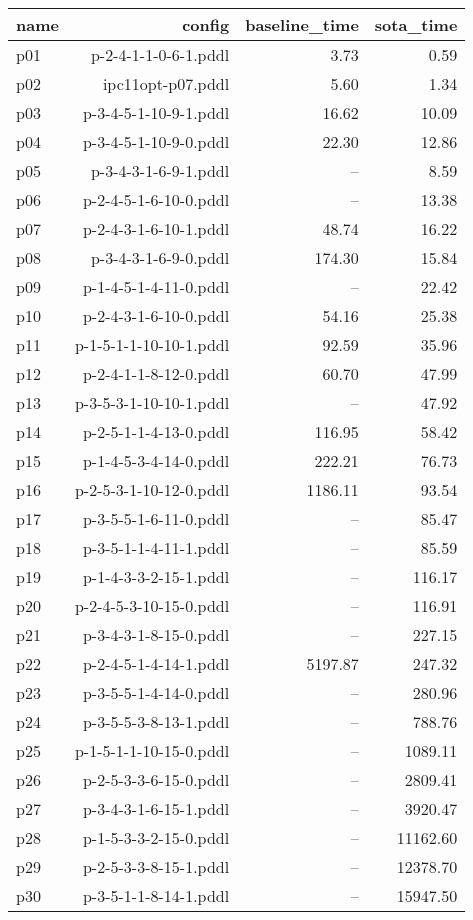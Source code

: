 \documentclass{article}
\begin{document}
                            \begin{center}
                            \scriptsize
                            \begin{tabular}{@{}l|r|r|r@{}}
                            name & config & baseline\_time & sota\_time\\\midrule
                              p01& p-2-4-1-1-0-6-1.pddl&3.73&0.59\\
  p02& ipc11opt-p07.pddl&5.60&1.34\\
  p03& p-3-4-5-1-10-9-1.pddl&16.62&10.09\\
  p04& p-3-4-5-1-10-9-0.pddl&22.30&12.86\\
  p05& p-3-4-3-1-6-9-1.pddl&--&8.59\\
  p06& p-2-4-5-1-6-10-0.pddl&--&13.38\\
  p07& p-2-4-3-1-6-10-1.pddl&48.74&16.22\\
  p08& p-3-4-3-1-6-9-0.pddl&174.30&15.84\\
  p09& p-1-4-5-1-4-11-0.pddl&--&22.42\\
  p10& p-2-4-3-1-6-10-0.pddl&54.16&25.38\\
  p11& p-1-5-1-1-10-10-1.pddl&92.59&35.96\\
  p12& p-2-4-1-1-8-12-0.pddl&60.70&47.99\\
  p13& p-3-5-3-1-10-10-1.pddl&--&47.92\\
  p14& p-2-5-1-1-4-13-0.pddl&116.95&58.42\\
  p15& p-1-4-5-3-4-14-0.pddl&222.21&76.73\\
  p16& p-2-5-3-1-10-12-0.pddl&1186.11&93.54\\
  p17& p-3-5-5-1-6-11-0.pddl&--&85.47\\
  p18& p-3-5-1-1-4-11-1.pddl&--&85.59\\
  p19& p-1-4-3-3-2-15-1.pddl&--&116.17\\
  p20& p-2-4-5-3-10-15-0.pddl&--&116.91\\
  p21& p-3-4-3-1-8-15-0.pddl&--&227.15\\
  p22& p-2-4-5-1-4-14-1.pddl&5197.87&247.32\\
  p23& p-3-5-5-1-4-14-0.pddl&--&280.96\\
  p24& p-3-5-5-3-8-13-1.pddl&--&788.76\\
  p25& p-1-5-1-1-10-15-0.pddl&--&1089.11\\
  p26& p-2-5-3-3-6-15-0.pddl&--&2809.41\\
  p27& p-3-4-3-1-6-15-1.pddl&--&3920.47\\
  p28& p-1-5-3-3-2-15-0.pddl&--&11162.60\\
  p29& p-2-5-3-3-8-15-1.pddl&--&12378.70\\
  p30& p-3-5-1-1-8-14-1.pddl&--&15947.50
                            \end{tabular}
                            \end{center}
                    
                
\end{document}
